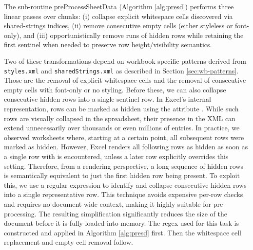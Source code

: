 The sub-routine \textsf{preProcessSheetData} (Algorithm \ref{alg:presd}) performs three linear passes over chunks:
(i) collapse explicit whitespace cells discovered via shared-strings indices,
(ii) remove consecutive empty cells (either styleless or font-only),
and (iii) opportunistically remove runs of hidden rows
while retaining the first sentinel
when needed to preserve row height/visibility semantics.

Two of these transformations depend on workbook-specific patterns
derived from \texttt{styles.xml} and \texttt{sharedStrings.xml} as described in Section
\ref{sec:wb-patterns}. Those are the removal of explicit whitespace cells
and the removal of consecutive empty cells with font-only or no styling.
Before these, we can also collapse consecutive hidden rows
into a single sentinel row.
In Excel’s internal representation,
rows can be marked as hidden using the attribute .
While such rows are visually collapsed in the spreadsheet,
their presence in the XML can extend unnecessarily over thousands or even millions
of entries. In practice, we observed worksheets where, starting at a certain point,
all subsequent rows were marked as hidden.
However, Excel renders all following rows as hidden
as soon as a single row with  is encountered,
unless a later row explicitly overrides this setting.
Therefore, from a rendering perspective,
a long sequence of hidden rows is semantically equivalent to just the first hidden row
being present.
To exploit this, we use a regular expression to identify
and collapse consecutive hidden rows into a single representative row.
This technique avoids expensive per-row checks and requires no document-wide context,
making it highly suitable for pre-processing.
The resulting simplification significantly reduces the size of the document
before it is fully loaded into memory.
The regex used for this task is constructed and applied in Algorithm \ref{alg:presd} first.
Then the whitespace cell replacement and empty cell removal follow.


